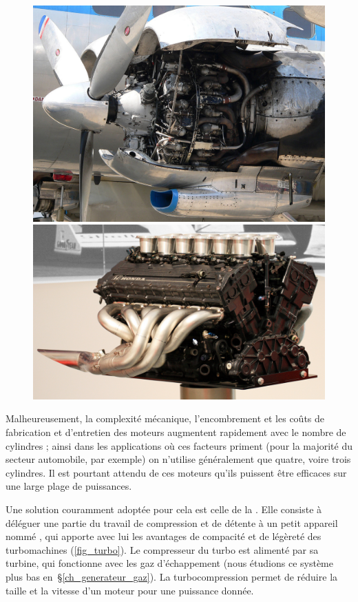 		\begin{figure}
			\begin{center}
				\includegraphics[height=0.325\textwidth]{images/curtiss_wright_cyclone.jpg}
				\includegraphics[height=0.325\textwidth]{images/honda_v12.jpg}
			\end{center}
			\label{fig_beaucoup_cylindres}
		\end{figure}
		
		Malheureusement, la complexité mécanique, l’encombrement et les coûts de fabrication et d’entretien des moteurs augmentent rapidement avec le nombre de cylindres ; ainsi dans les applications où ces facteurs priment (pour la majorité du secteur automobile, par exemple) on n’utilise généralement que quatre, voire trois cylindres. Il est pourtant attendu de ces moteurs qu’ils puissent être efficaces sur une large plage de puissances.
	
		Une solution couramment adoptée pour cela est celle de la . Elle consiste à déléguer une partie du travail de compression et de détente à un petit appareil nommé , qui apporte avec lui les avantages de compacité et de légèreté des turbomachines (\cref{fig_turbo}). Le compresseur du turbo est alimenté par sa turbine, qui fonctionne avec les gaz d’échappement (nous étudions ce système plus bas en~\S\ref{ch_generateur_gaz}). La turbocompression permet de réduire la taille et la vitesse d’un moteur pour une puissance donnée.
		
